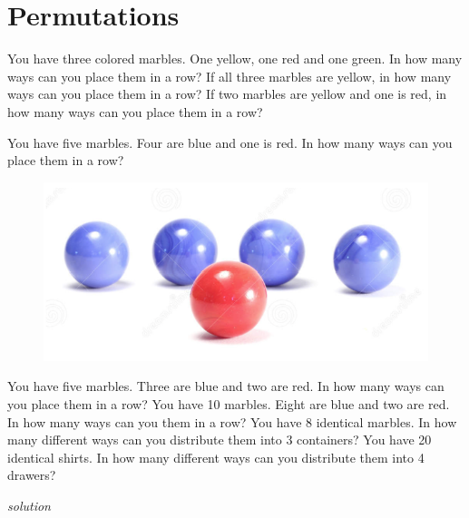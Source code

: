\documentclass{amsbook}
\begin{document}
\section{Permutations}

\begin{Exercise}[title={Rearrangements Again}, difficulty=0, label=p1]
    \Question You have three colored marbles. One yellow, one red and one green. In how many ways can you place them in a row?
    \Question If all three marbles are yellow, in how many ways can you place them in a row?
    \Question If two marbles are yellow and one is red, in how many ways can you place them in a row?
\end{Exercise}

\begin{Exercise}[title={Marbles}, difficulty=1, label=p2]
    You have five marbles. Four are blue and one is red. In how many ways can you place them in a row?
    \begin{figure}[H]
        \includegraphics[width=.4\linewidth]{n.png}        
    \end{figure}
\end{Exercise}

\begin{Exercise}[title={Marbles II}, difficulty=2, label=p3]
    \Question You have five marbles. Three are blue and two are red. In how many ways can you place them in a row?
    \Question You have 10 marbles. Eight are blue and two are red. In how many ways can you them in a row?
    \Question You have 8 identical marbles. In how many different ways can you distribute them into 3 containers?
    \Question You have 20 identical shirts. In how many different ways can you distribute them into 4 drawers?

\hfill \emph{solution} 
\end{Exercise}

\begin{Answer}[ref={p3}]
    
\end{Answer}

\begin{Exercise}[title={An Ice Cream Cone a Day}, difficulty=1, label=p4]
    
\end{Exercise}
\end{document}
